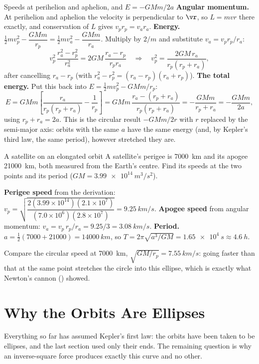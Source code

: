 \begin{derivbox}{Speeds at perihelion and aphelion, and $E=-GMm/2a$}
 \textbf{Angular momentum.} At perihelion and aphelion the velocity is perpendicular to $\vr$,
so $L=mvr$ there exactly, and conservation of $L$ gives $v_pr_p=v_ar_a$.
 \textbf{Energy.} $\tfrac12mv_p^2-\dfrac{GMm}{r_p}=\tfrac12mv_a^2-\dfrac{GMm}{r_a}$. Multiply by $2/m$
and substitute $v_a=v_pr_p/r_a$:
\[
v_p^2\,\frac{r_a^2-r_p^2}{r_a^2}=2GM\,\frac{r_a-r_p}{r_pr_a}
\quad\Longrightarrow\quad
v_p^2=\frac{2GM\,r_a}{r_p(r_p+r_a)},
\]
after cancelling $r_a-r_p$ (with $r_a^2-r_p^2=(r_a-r_p)(r_a+r_p)$).
 \textbf{The total energy.} Put this back into $E=\tfrac12mv_p^2-GMm/r_p$:
\[
E=GMm\left[\frac{r_a}{r_p(r_p+r_a)}-\frac{1}{r_p}\right]=GMm\,\frac{r_a-(r_p+r_a)}{r_p(r_p+r_a)}=-\frac{GMm}{r_p+r_a}=-\frac{GMm}{2a},
\]
using $r_p+r_a=2a$. This is the circular result $-GMm/2r$ with $r$ replaced by the semi-major axis: orbits with the same $a$
have the same energy (and, by Kepler's third law, the same period), however stretched they are.
\end{derivbox}

\begin{exbox}{A satellite on an elongated orbit}
A satellite's perigee is \SI{7000}{km} and its apogee \SI{21000}{km}, both measured from the Earth's
centre. Find its speeds at the two points and its period ($GM=\SI{3.99e14}{m^3/s^2}$).

 \textbf{Perigee speed} from the derivation:
$v_p=\sqrt{\dfrac{2(3.99\times10^{14})(2.1\times10^{7})}{(7.0\times10^{6})(2.8\times10^{7})}}=\SI{9.25}{km/s}$.
 \textbf{Apogee speed} from angular momentum: $v_a=v_p\,r_p/r_a=9.25/3=\SI{3.08}{km/s}$.
 \textbf{Period.} $a=\tfrac12(7000+21000)=\SI{14000}{km}$, so
$T=2\pi\sqrt{a^3/GM}=\SI{1.65e4}{s}\approx\SI{4.6}{h}$.

Compare the circular speed at \SI{7000}{km}, $\sqrt{GM/r_p}=\SI{7.55}{km/s}$: going faster than that at
the same point stretches the circle into this ellipse, which is exactly what Newton's cannon
() showed. 
\end{exbox}

\section{Why the Orbits Are Ellipses}\label{sec:ellipse}

Everything so far has assumed Kepler's first law: the orbits have been taken to be ellipses, and the
last section used only their ends. The remaining question is why an inverse-square force produces
exactly this curve and no other.

